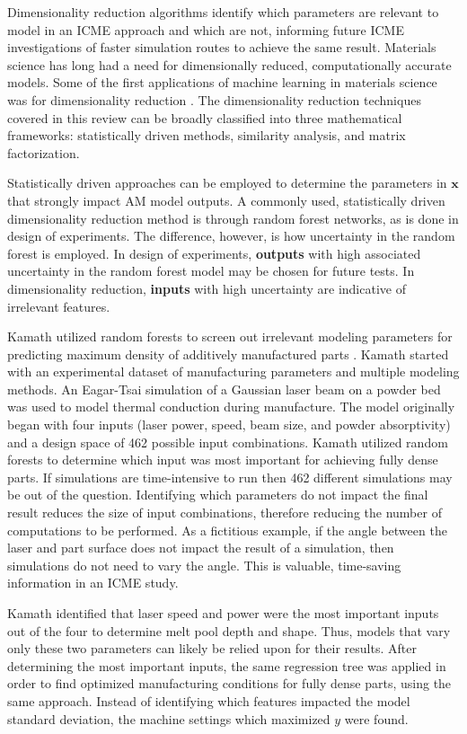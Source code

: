 Dimensionality reduction algorithms identify which parameters are relevant to model in an ICME approach and which are not, informing future ICME investigations of faster simulation routes to achieve the same result. Materials science has long had a need for dimensionally reduced, computationally accurate models. Some of the first applications of machine learning in materials science was for dimensionality reduction \cite{Fischer2006, Flores-Livas2017, Rupp2011, Snyder2012}. The dimensionality reduction techniques covered in this review can be broadly classified into three mathematical frameworks: statistically driven methods, similarity analysis, and matrix factorization.

Statistically driven approaches can be employed to determine the parameters in $\mathbf{x}$ that strongly impact AM model outputs. A commonly used, statistically driven dimensionality reduction method is through random forest networks, as is done in design of experiments. The difference, however, is how uncertainty in the random forest is employed. In design of experiments, \textbf{outputs} with high associated uncertainty in the random forest model may be chosen for future tests. In dimensionality reduction, \textbf{inputs} with high uncertainty are indicative of irrelevant features.

Kamath utilized random forests to screen out irrelevant modeling parameters for predicting maximum density of additively manufactured parts \cite{Kamath2016}. Kamath started with an experimental dataset of manufacturing parameters and multiple modeling methods. An Eagar-Tsai simulation of a Gaussian laser beam on a powder bed was used to model thermal conduction during manufacture. The model originally began with four inputs (laser power, speed, beam size, and powder absorptivity) and a design space of 462 possible input combinations. Kamath utilized random forests to determine which input was most important for achieving fully dense parts. If simulations are time-intensive to run then 462 different simulations may be out of the question. Identifying which parameters do not impact the final result reduces the size of input combinations, therefore reducing the number of computations to be performed. As a fictitious example, if the angle between the laser and part surface does not impact the result of a simulation, then simulations do not need to vary the angle. This is valuable, time-saving information in an ICME study.

Kamath identified that laser speed and power were the most important inputs out of the four to determine melt pool depth and shape. Thus, models that vary only these two parameters can likely be relied upon for their results.  After determining the most important inputs, the same regression tree was applied in order to find optimized manufacturing conditions for fully dense parts, using the same approach. Instead of identifying which features impacted the model standard deviation, the machine settings which maximized $y$ were found. 

